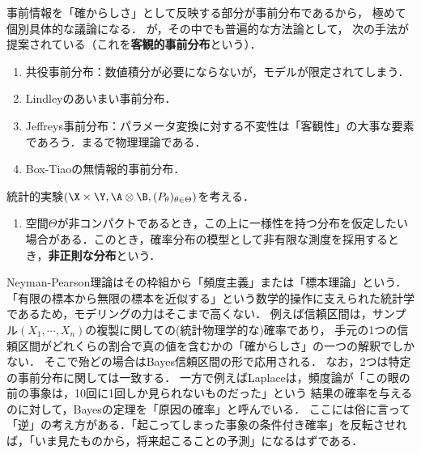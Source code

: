 \documentclass[uplatex,dvipdfmx]{jsreport}
\begin{document}
\begin{tcolorbox}[colframe=ForestGreen, colback=ForestGreen!10!white,breakable,colbacktitle=ForestGreen!40!white,coltitle=black,fonttitle=\bfseries\sffamily,
title=]
    事前情報を「確からしさ」として反映する部分が事前分布であるから，
    極めて個別具体的な議論になる．
    が，その中でも普遍的な方法論として，
    次の手法が提案されている（これを\textbf{客観的事前分布}という）．
    \begin{enumerate}
        \item 共役事前分布：数値積分が必要にならないが，モデルが限定されてしまう．
        \item Lindleyのあいまい事前分布．
        \item Jeffreys事前分布：パラメータ変換に対する不変性は「客観性」の大事な要素であろう．まるで物理理論である．
        \item Box-Tiaoの無情報的事前分布．
    \end{enumerate}
\end{tcolorbox}

\begin{definition}[improper]
    統計的実験$(\X\times\Y,\A\otimes\B,(P_\theta)_{\theta\in\Theta})$を考える．
    \begin{enumerate}
        \item 空間$\Theta$が非コンパクトであるとき，この上に一様性を持つ分布を仮定したい場合がある．このとき，確率分布の模型として非有限な測度を採用するとき，\textbf{非正則な分布}という．
    \end{enumerate}
\end{definition}

\begin{remarks}
    Neyman-Pearson理論はその枠組から「頻度主義」または「標本理論」という．
    「有限の標本から無限の標本を近似する」という数学的操作に支えられた統計学であるため，モデリングの力はそこまで高くない．
    例えば信頼区間は，サンプル$(X_1,\cdots,X_n)$の複製に関しての(統計物理学的な)確率であり，
    手元の1つの信頼区間がどれくらの割合で真の値を含むかの「確からしさ」の一つの解釈でしかない．
    そこで殆どの場合はBayes信頼区間の形で応用される．
    なお，2つは特定の事前分布に関しては一致する．
    一方で例えばLaplaceは，頻度論が「この眼の前の事象は，10回に1回しか見られないものだった」という
    結果の確率を与えるのに対して，Bayesの定理を「原因の確率」と呼んでいる．
    ここには俗に言って「逆」の考え方がある．「起こってしまった事象の条件付き確率」を反転させれば，「いま見たものから，将来起こることの予測」になるはずである．
\end{remarks}
\end{document}

